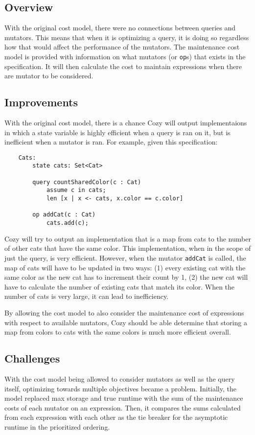 \newcommand{\code}[1]{\texttt{#1}}

\subsection{Overview}
With the original cost model, there were no connections between queries and
mutators. This means that when it is optimizing a query, it is doing so
regardless how that would affect the performance of the mutators.
The maintenance cost model is provided with information on what mutators (or
\code{op}s) that exists in the specification. It will then calculate the cost to
maintain expressions when there are mutator to be considered.

\subsection{Improvements}
With the original cost model, there is a chance Cozy will output implementaions
in which a state variable is highly efficient when a query is ran on it, but
is inefficient when a mutator is ran. For example, given this specification:

\begin{lstlisting}
    Cats:
        state cats: Set<Cat>

        query countSharedColor(c : Cat)
            assume c in cats;
            len [x | x <- cats, x.color == c.color]

        op addCat(c : Cat)
            cats.add(c);
\end{lstlisting}

Cozy will try to output an implementation that is a map from cats to the number
of other cats that have the same color. This implementation, when in the scope
of just the query, is very efficient. However, when the mutator \code{addCat} is
called, the map of cats will have to be updated in two ways: (1) every existing
cat with the same color as the new cat has to increment their count by 1, (2)
the new cat will have to calculate the number of existing cats that match its
color. When the number of cats is very large, it can lead to inefficiency.

By allowing the cost model to also consider the maintenance cost of expressions
with respect to available mutators, Cozy should be able determine that storing
a map from colors to cats with the same colors is much more efficient overall.

\subsection{Challenges}
With the cost model being allowed to consider mutators as well as the query
itself, optimizing towards multiple objectives became a problem. Initially, the
model replaced max storage and true runtime with the sum of the maintenance
costs of each mutator on an expression. Then, it compares the sums calculated
from each expression with each other as the tie breaker for the asymptotic
runtime in the prioritized ordering.

